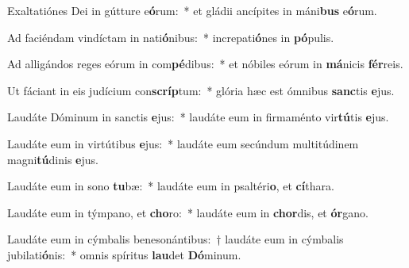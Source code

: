 \item Exaltatiónes Dei in gútture e\textbf{ó}rum:~* et gládii ancípites in máni\textbf{bus} e\textbf{ó}rum.
\item Ad faciéndam vindíctam in nati\textbf{ó}nibus:~* increpati\textbf{ó}nes in \textbf{pó}pulis.
\item Ad alligándos reges eórum in com\textbf{pé}dibus:~* et nóbiles eórum in \textbf{má}nicis \textbf{fér}reis.
\item Ut fáciant in eis judícium con\textbf{scríp}tum:~* glória hæc est ómnibus \textbf{sanc}tis \textbf{e}jus.
\item Laudáte Dóminum in sanctis \textbf{e}jus:~* laudáte eum in firmaménto vir\textbf{tú}tis \textbf{e}jus.
\item Laudáte eum in virtútibus \textbf{e}jus:~* laudáte eum secúndum multitúdinem magni\textbf{tú}dinis \textbf{e}jus.
\item Laudáte eum in sono \textbf{tu}bæ:~* laudáte eum in psaltéri\textbf{o}, et \textbf{cí}thara.
\item Laudáte eum in týmpano, et \textbf{cho}ro:~* laudáte eum in \textbf{chor}dis, et \textbf{ór}gano.
\item Laudáte eum in cýmbalis benesonántibus:~† laudáte eum in cýmbalis jubilati\textbf{ó}nis:~* omnis spíritus \textbf{lau}det \textbf{Dó}minum.
